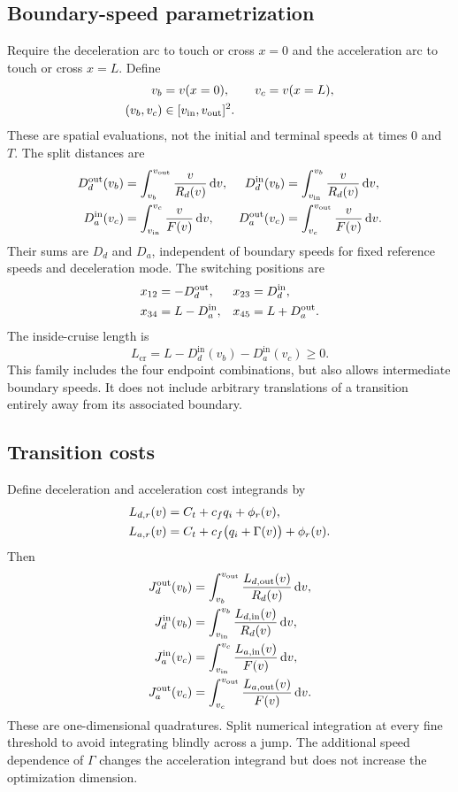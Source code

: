 \documentclass[conference,a4paper]{IEEEtran}
\newcommand{\dd}{\,\mathrm{d}}
\newcommand{\out}{\mathrm{out}}
\newcommand{\inn}{\mathrm{in}}
\newcommand{\cruise}{\mathrm{cr}}
\begin{document}
\subsection{Boundary-speed parametrization}
Require the deceleration arc to touch or cross $x=0$ and the acceleration arc to touch or cross $x=L$. Define
\begin{align}
v_b&=v(x=0),\qquad v_c=v(x=L),\notag\\
(v_b,v_c)&\in[v_{\inn},v_{\out}]^2.
\end{align}
These are spatial evaluations, not the initial and terminal speeds at times 0 and $T$. The split distances are
\begin{align}
D_d^{\out}(v_b)&=\int_{v_b}^{v_{\out}}\frac{v}{R_d(v)}\dd v,&
D_d^{\inn}(v_b)&=\int_{v_{\inn}}^{v_b}\frac{v}{R_d(v)}\dd v,\notag\\
D_a^{\inn}(v_c)&=\int_{v_{\inn}}^{v_c}\frac{v}{F(v)}\dd v,&
D_a^{\out}(v_c)&=\int_{v_c}^{v_{\out}}\frac{v}{F(v)}\dd v.
\label{eq:splitdist}
\end{align}
Their sums are $D_d$ and $D_a$, independent of boundary speeds for fixed reference speeds and deceleration mode. The switching positions are
\begin{align}
x_{12}&=-D_d^{\out},&x_{23}&=D_d^{\inn},\notag\\
x_{34}&=L-D_a^{\inn},&x_{45}&=L+D_a^{\out}.
\label{eq:switchpositions}
\end{align}
The inside-cruise length is
\begin{equation}
L_{\cruise}=L-D_d^{\inn}(v_b)-D_a^{\inn}(v_c)\ge0.
\label{eq:feasibility}
\end{equation}
This family includes the four endpoint combinations, but also allows intermediate boundary speeds. It does not include arbitrary translations of a transition entirely away from its associated boundary.

\subsection{Transition costs}
Define deceleration and acceleration cost integrands by
\begin{align}
L_{d,r}(v)&=C_t+c_fq_i+\phi_r(v),\notag\\
L_{a,r}(v)&=C_t+c_f\bigl(q_i+\Gamma(v)\bigr)+\phi_r(v).
\end{align}
Then
\begin{align}
J_d^{\out}(v_b)&=\int_{v_b}^{v_{\out}}\frac{L_{d,\out}(v)}{R_d(v)}\dd v,\notag\\
J_d^{\inn}(v_b)&=\int_{v_{\inn}}^{v_b}\frac{L_{d,\inn}(v)}{R_d(v)}\dd v,\notag\\
J_a^{\inn}(v_c)&=\int_{v_{\inn}}^{v_c}\frac{L_{a,\inn}(v)}{F(v)}\dd v,\notag\\
J_a^{\out}(v_c)&=\int_{v_c}^{v_{\out}}\frac{L_{a,\out}(v)}{F(v)}\dd v.
\label{eq:splitcost}
\end{align}
These are one-dimensional quadratures. Split numerical integration at every fine threshold to avoid integrating blindly across a jump. The additional speed dependence of $\Gamma$ changes the acceleration integrand but does not increase the optimization dimension.
\end{document}
